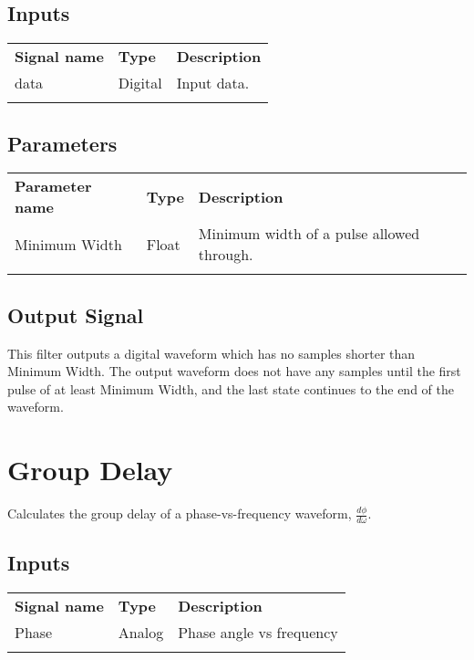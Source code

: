 \subsection{Inputs}

\begin{tabularx}{16cm}{llX}
\thickhline
\textbf{Signal name} & \textbf{Type} & \textbf{Description} \\
\thickhline
data & Digital & Input data. \\
\thickhline
\end{tabularx}

\subsection{Parameters}

\begin{tabularx}{16cm}{llX}
\thickhline
\textbf{Parameter name} & \textbf{Type} & \textbf{Description} \\
\thickhline
Minimum Width & Float & Minimum width of a pulse allowed through.\\
\thickhline
\end{tabularx}

\subsection{Output Signal}

This filter outputs a digital waveform which has no samples shorter than Minimum Width. The output waveform does not have any samples until the first pulse of at least Minimum Width, and the last state continues to the end of the waveform.

\pagebreak
\section{Group Delay}
\label{filter:groupdelay}

Calculates the group delay of a phase-vs-frequency waveform, $\frac{d\phi}{d\omega}$.

\subsection{Inputs}

\begin{tabularx}{16cm}{llX}
\thickhline
\textbf{Signal name} & \textbf{Type} & \textbf{Description} \\
\thickhline
Phase & Analog & Phase angle vs frequency\\
\thickhline
\end{tabularx}


